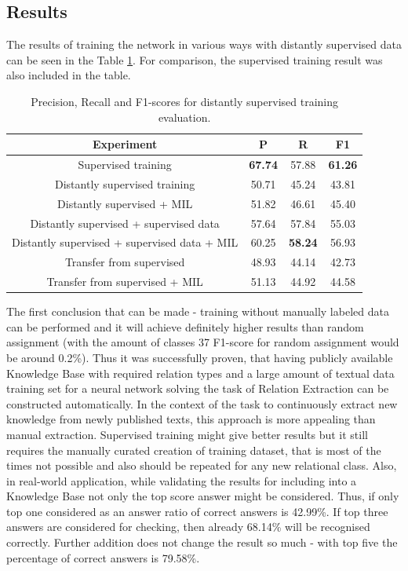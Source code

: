 \subsection{Results}
\label{subs:gen-dist-res}
The results of training the network in various ways with distantly supervised data can be seen
in the Table \ref{tab:dist-gen-res}. For comparison, the supervised training result was also included in the 
table.

\begin{table}
  \begin{center}
 \begin{tabular}{ | c | c | c | c | }
    \hline
    Experiment & P & R & F1 \\ \hline
    Supervised training & \textbf{67.74} & 57.88 & \textbf{61.26} \\ \hline
    Distantly supervised training & 50.71 & 45.24 & 43.81 \\ \hline
    Distantly supervised + MIL & 51.82 & 46.61 & 45.40 \\ \hline
    Distantly supervised + supervised data & 57.64 & 57.84 & 55.03 \\ \hline
    Distantly supervised + supervised data + MIL & 60.25 & \textbf{58.24} & 56.93 \\ \hline
    Transfer from supervised & 48.93 & 44.14 & 42.73 \\ \hline
    Transfer from supervised + MIL & 51.13 & 44.92 & 44.58 \\ \hline
    \end{tabular}
\caption[General domain, Distant Supervision experiments results]{Precision, Recall and F1-scores for distantly supervised training evaluation.}
\label{tab:dist-gen-res}
\end{center}
\end{table}

The first conclusion that can be made - training without manually labeled data can be performed and 
it will achieve definitely higher results than random assignment (with the amount of classes 37 
F1-score for random assignment would be around 0.2\%). Thus it was successfully proven, that 
having publicly available Knowledge Base with required relation types and a large amount of textual data 
training set for a neural network solving the task of Relation Extraction can be constructed automatically. In
the context of the task to continuously extract new knowledge from newly published texts, this approach is 
more appealing than manual extraction. Supervised training might give better results but it still 
requires the manually curated creation of training dataset, that is most of the times not possible and also 
should be repeated for any new relational class. Also, in real-world application, while validating the 
results for including into a Knowledge Base not only the top score answer might be considered. Thus, 
if only top one considered as an answer ratio of correct answers is 42.99\%. If top three answers 
are considered for checking, then already 68.14\% will be recognised correctly. Further addition does 
not change the result so much - with top five the percentage of correct answers is 79.58\%.

